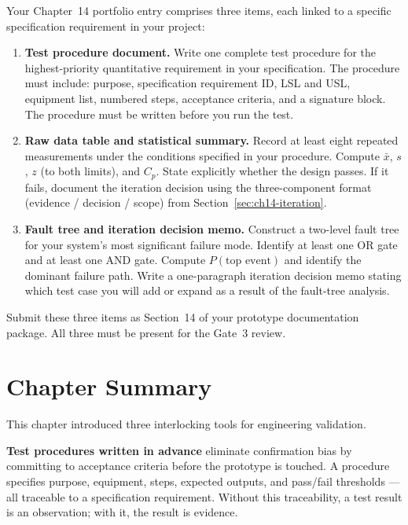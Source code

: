 Your Chapter~14 portfolio entry comprises three items, each
linked to a specific specification requirement in your project:

\begin{enumerate}
  \item \textbf{Test procedure document.}
        Write one complete test procedure for the highest-priority quantitative requirement
        in your specification.
        The procedure must include: purpose, specification requirement ID, LSL and USL,
        equipment list, numbered steps, acceptance criteria, and a signature block.
        The procedure must be written before you run the test.

  \item \textbf{Raw data table and statistical summary.}
        Record at least eight repeated measurements under the conditions specified in your
        procedure.
        Compute $\bar{x}$, $s$, $z$ (to both limits), and $C_p$.
        State explicitly whether the design passes.
        If it fails, document the iteration decision using the three-component format
        (evidence / decision / scope) from Section~\ref{sec:ch14-iteration}.

  \item \textbf{Fault tree and iteration decision memo.}
        Construct a two-level fault tree for your system's most significant failure mode.
        Identify at least one OR gate and at least one AND gate.
        Compute $P(\text{top event})$ and identify the dominant failure path.
        Write a one-paragraph iteration decision memo stating which test case you will
        add or expand as a result of the fault-tree analysis.
\end{enumerate}

Submit these three items as Section~14 of your prototype documentation package.
All three must be present for the Gate~3 review.

\section*{Chapter Summary}
\label{sec:ch14-summary}

This chapter introduced three interlocking tools for engineering validation.

\textbf{Test procedures written in advance} eliminate confirmation bias by committing to
acceptance criteria before the prototype is touched.
A procedure specifies purpose, equipment, steps, expected outputs, and pass/fail
thresholds --- all traceable to a specification requirement.
Without this traceability, a test result is an observation; with it, the result is
evidence.

